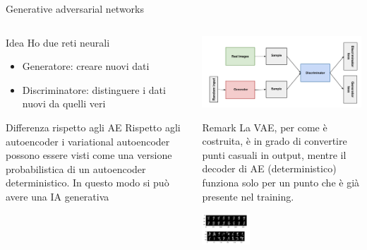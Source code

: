 \documentclass[11pt]{beamer}
\begin{document}
\begin{frame}{Generative adversarial networks \cite{pml1Book,pml2Book}}
\begin{columns}
\begin{column}{0.5\textwidth}
\begin{alertblock}{Idea}
Ho due reti neurali
\begin{itemize}
\item Generatore: creare nuovi dati
\item Discriminatore: distinguere i dati nuovi da quelli veri
\end{itemize}
\end{alertblock}
\begin{alertblock}{Differenza rispetto agli AE}
Rispetto agli autoencoder i variational autoencoder possono essere visti come una versione probabilistica di un autoencoder deterministico. In questo modo si può avere una IA generativa
\end{alertblock}
\end{column}
\begin{column}{0.4\textwidth}  
\begin{center}
\includegraphics[width=\textwidth]{Pic/GAN.png}
\end{center}
\begin{alertblock}{Remark}
La VAE, per come è costruita, è in grado di convertire punti casuali in output, mentre il decoder di AE (deterministico) funziona solo per un punto che è già presente nel training. 
\end{alertblock}
\begin{center}
\includegraphics[width=0.3\textwidth]{Pic/AE_vs_VAE.png}
\end{center}
\end{column}
\end{columns}
\end{frame}
\end{document}
